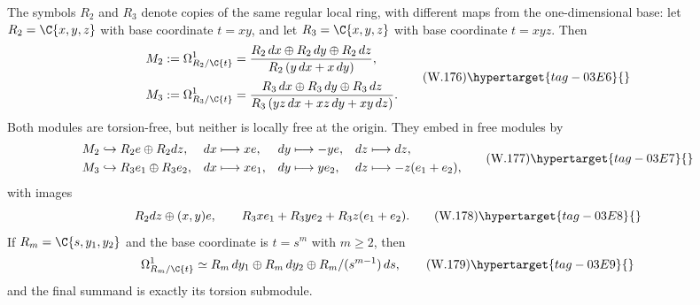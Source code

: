 \begin{proposition}
\hypertarget{tag-03IP}{}\label{wbII:prop:relative-local}

The symbols $R_2$ and $R_3$ denote copies of the same regular local ring,
with different maps from the one-dimensional base:
let $R_2=\C\{x,y,z\}$ with base coordinate $t=xy$, and let
$R_3=\C\{x,y,z\}$ with base coordinate $t=xyz$.  Then
\[
\begin{aligned}
 M_2&:=\Omega^1_{R_2/\C\{t\}}
 =\frac{R_2\,dx\oplus R_2\,dy\oplus R_2\,dz}
        {R_2\,(y\,dx+x\,dy)},\\[2pt]
 M_3&:=\Omega^1_{R_3/\C\{t\}}
 =\frac{R_3\,dx\oplus R_3\,dy\oplus R_3\,dz}
        {R_3\,(yz\,dx+xz\,dy+xy\,dz)}.
\end{aligned}
\tag{W.176}\hypertarget{tag-03E6}{}\label{wbII:eq:CN:6.1}
\]
Both modules are torsion-free, but neither is locally free at the origin.
They embed in free modules by
\[
\begin{aligned}
 M_2&\hookrightarrow R_2e\oplus R_2dz,
 &dx&\longmapsto xe,&dy&\longmapsto-ye,&dz&\longmapsto dz,\\
 M_3&\hookrightarrow R_3e_1\oplus R_3e_2,
 &dx&\longmapsto xe_1,&dy&\longmapsto ye_2,&dz&\longmapsto-z(e_1+e_2),
\end{aligned}
\tag{W.177}\hypertarget{tag-03E7}{}\label{wbII:eq:CN:6.2}
\]
with images
\[
 R_2dz\oplus (x,y)e,
 \qquad
 R_3xe_1+R_3ye_2+R_3z(e_1+e_2).
\tag{W.178}\hypertarget{tag-03E8}{}\label{wbII:eq:CN:6.3}
\]
If $R_m=\C\{s,y_1,y_2\}$ and the base coordinate is $t=s^m$ with
$m\ge2$, then
\[
\Omega^1_{R_m/\C\{t\}}
\simeq R_m\,dy_1\oplus R_m\,dy_2
       \oplus R_m/(s^{m-1})\,ds,
\tag{W.179}\hypertarget{tag-03E9}{}\label{wbII:eq:CN:6.4}
\]
and the final summand is exactly its torsion submodule.
\end{proposition}



